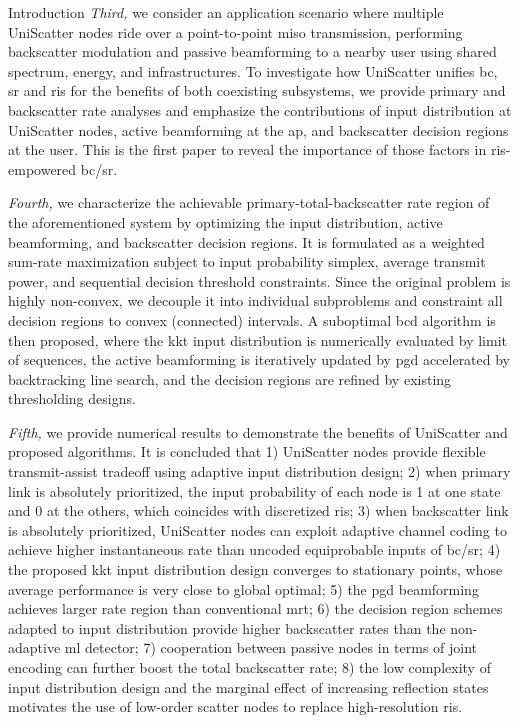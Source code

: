 \documentclass[journal]{IEEEtran}
\begin{document}
\begin{section}{Introduction}
	\emph{Third,} we consider an application scenario where multiple UniScatter nodes ride over a point-to-point \gls{miso} transmission, performing backscatter modulation and passive beamforming to a nearby user using shared spectrum, energy, and infrastructures.
	To investigate how UniScatter unifies \gls{bc}, \gls{sr} and \gls{ris} for the benefits of both coexisting subsystems, we provide primary and backscatter rate analyses and emphasize the contributions of input distribution at UniScatter nodes, active beamforming at the \gls{ap}, and backscatter decision regions at the user.
	This is the first paper to reveal the importance of those factors in \gls{ris}-empowered \gls{bc}/\gls{sr}.

	\emph{Fourth,} we characterize the achievable primary-total-backscatter rate region of the aforementioned system by optimizing the input distribution, active beamforming, and backscatter decision regions.
	It is formulated as a weighted sum-rate maximization subject to input probability simplex, average transmit power, and sequential decision threshold constraints.
	Since the original problem is highly non-convex, we decouple it into individual subproblems and constraint all decision regions to convex (connected) intervals.
	A suboptimal \gls{bcd} algorithm is then proposed, where the \gls{kkt} input distribution is numerically evaluated by limit of sequences, the active beamforming is iteratively updated by \gls{pgd} accelerated by backtracking line search, and the decision regions are refined by existing thresholding designs.

	\emph{Fifth,} we provide numerical results to demonstrate the benefits of UniScatter and proposed algorithms.
	It is concluded that 1) UniScatter nodes provide flexible transmit-assist tradeoff using adaptive input distribution design; 2) when primary link is absolutely prioritized, the input probability of each node is \num{1} at one state and \num{0} at the others, which coincides with discretized \gls{ris}; 3) when backscatter link is absolutely prioritized, UniScatter nodes can exploit adaptive channel coding to achieve higher instantaneous rate than uncoded equiprobable inputs of \gls{bc}/\gls{sr}; 4) the proposed \gls{kkt} input distribution design converges to stationary points, whose average performance is very close to global optimal; 5) the \gls{pgd} beamforming achieves larger rate region than conventional \gls{mrt}; 6) the decision region schemes adapted to input distribution provide higher backscatter rates than the non-adaptive \gls{ml} detector; 7) cooperation between passive nodes in terms of joint encoding can further boost the total backscatter rate; 8) the low complexity of input distribution design and the marginal effect of increasing reflection states motivates the use of low-order scatter nodes to replace high-resolution \gls{ris}.


\end{section}
\end{document}
